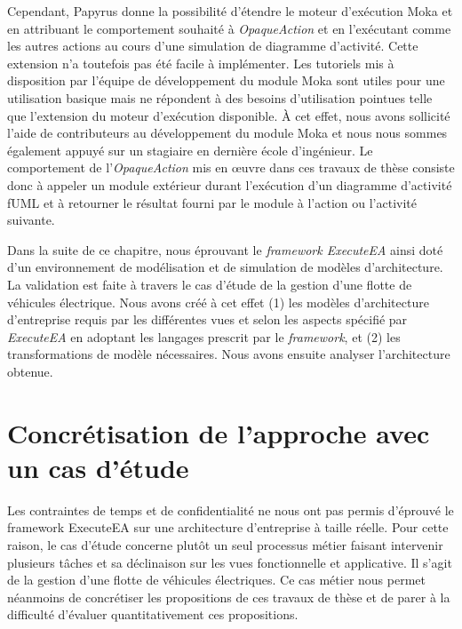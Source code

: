     Cependant, Papyrus donne la possibilité d'étendre le moteur d'exécution Moka
    et en attribuant le comportement souhaité à \emph{OpaqueAction} et en
    l'exécutant comme les autres actions au cours d'une simulation de diagramme
    d'activité. Cette extension n'a toutefois pas été facile à implémenter. Les
    tutoriels mis à disposition par l'équipe de développement du module Moka
    sont utiles pour une utilisation basique mais ne répondent à des besoins
    d'utilisation pointues telle que l'extension du moteur d'exécution
    disponible. À cet effet, nous avons sollicité l'aide de contributeurs au
    développement du module Moka et nous nous sommes également appuyé sur un
    stagiaire en dernière école d'ingénieur. Le comportement de
    l'\emph{OpaqueAction} mis en œuvre dans ces travaux de thèse consiste donc à
    appeler un module extérieur durant l'exécution d'un diagramme d'activité
    fUML et à retourner le résultat fourni par le module à l'action ou
    l'activité suivante.

    Dans la suite de ce chapitre, nous éprouvant le \emph{framework ExecuteEA}
    ainsi doté d'un environnement de modélisation et de simulation de modèles
    d'architecture. La validation est faite à travers le cas d'étude de la
    gestion d'une flotte de véhicules électrique. Nous avons créé à cet effet
    (1) les modèles d'architecture d'entreprise requis par les différentes vues
    et selon les aspects spécifié par \emph{ExecuteEA} en adoptant les langages
    prescrit par le \emph{framework}, et (2) les transformations de modèle
    nécessaires. Nous avons ensuite analyser l'architecture obtenue.


\section{Concrétisation de l'approche avec un cas d'étude}
\label{sec:concretisation_cas_metier}

    Les contraintes de temps et de confidentialité ne nous ont pas permis
    d'éprouvé le framework ExecuteEA sur une architecture d'entreprise à taille
    réelle. Pour cette raison, le cas d'étude concerne plutôt un seul processus
    métier faisant intervenir plusieurs tâches et sa déclinaison sur les vues
    fonctionnelle et applicative. Il s'agit de la gestion d'une flotte de
    véhicules électriques. Ce cas métier nous permet néanmoins de concrétiser
    les propositions de ces travaux de thèse et de parer à la difficulté
    d'évaluer quantitativement ces propositions.

